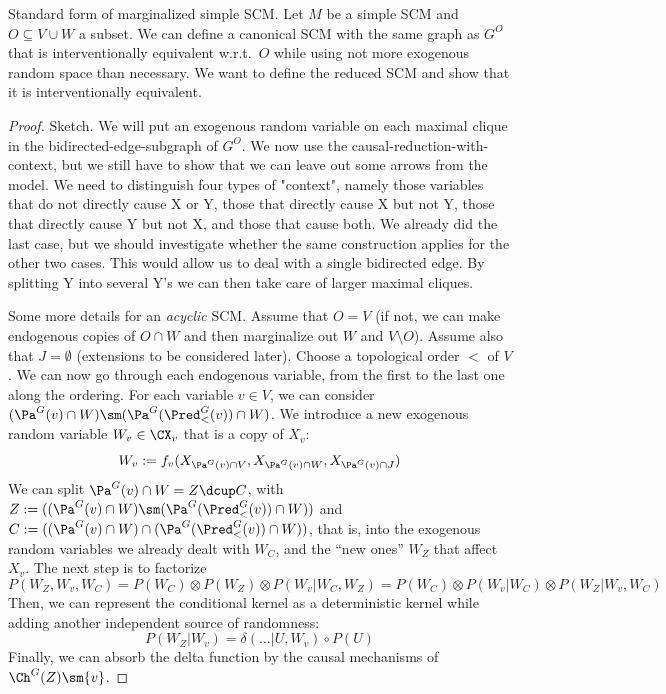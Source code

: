 \begin{Def}
   Standard form of marginalized simple SCM. Let $M$ be a simple SCM and $O \subseteq V \cup W$ a subset.
  We can define a canonical SCM with the same graph as $G^{O}$ that is interventionally equivalent w.r.t.\ $O$ while
  using not more exogenous random space than necessary.
  We want to define the reduced SCM and show that it is interventionally equivalent.
\end{Def}
\begin{proof}
  Sketch. We will put an exogenous random variable on each maximal clique in the bidirected-edge-subgraph of $G^O$.
  We now use the causal-reduction-with-context, but we still have to show that we can leave out some arrows from 
  the model. We need to distinguish four types of "context", namely those variables that do not directly cause X
  or Y, those that directly cause X but not Y, those that directly cause Y but not X, and those that cause both.
  We already did the last case, but we should investigate whether the same construction applies for the other two cases.
  This would allow us to deal with a single bidirected edge. By splitting Y into several Y's we can then take care of
  larger maximal cliques.

  Some more details for an \emph{acyclic} SCM. Assume that $O = V$ (if not, we can make endogenous copies of $O \cap W$ and then
  marginalize out $W$ and $V \setminus O$). Assume also that $J = \emptyset$ (extensions to be considered later).
  Choose a topological order $<$ of $V$.
  We can now go through each endogenous variable, from the first to the last one along the ordering.
  For each variable $v \in V$, we can consider $(\Pa^G(v) \cap W) \sm (\Pa^G(\Pred_<^G(v)) \cap W)$. 
  We introduce a new exogenous random variable $W_v \in \CX_v$ that is a copy of $X_v$:
  $$W_v := f_v(X_{\Pa^G(v) \cap V}, X_{\Pa^G(v) \cap W}, X_{\Pa^G(v) \cap J})$$
  We can split $\Pa^G(v) \cap W = Z \dcup C$, 
  with $Z := ((\Pa^G(v) \cap W) \sm (\Pa^G(\Pred_<^G(v)) \cap W))$ and $C := ((\Pa^G(v) \cap W) \cap (\Pa^G(\Pred_<^G(v)) \cap W))$,
  that is, into the exogenous random variables we already dealt with $W_C$, and the ``new ones'' $W_Z$ that affect $X_v$.
  The next step is to factorize 
  $$P(W_Z, W_v, W_C) = P(W_C) \otimes P(W_Z) \otimes P(W_v | W_C, W_Z) = P(W_C) \otimes P(W_v | W_C) \otimes P(W_Z | W_v,W_C)$$
  Then, we can represent the conditional kernel as a deterministic kernel while adding another independent source of randomness:
  \begin{equation*}
    P(W_Z | W_v) = \delta(\dots|U,W_v) \circ P(U) 
  \end{equation*}
  Finally, we can absorb the delta function by the causal mechanisms of $\Ch^G(Z) \sm \{v\}$.


\end{proof}
